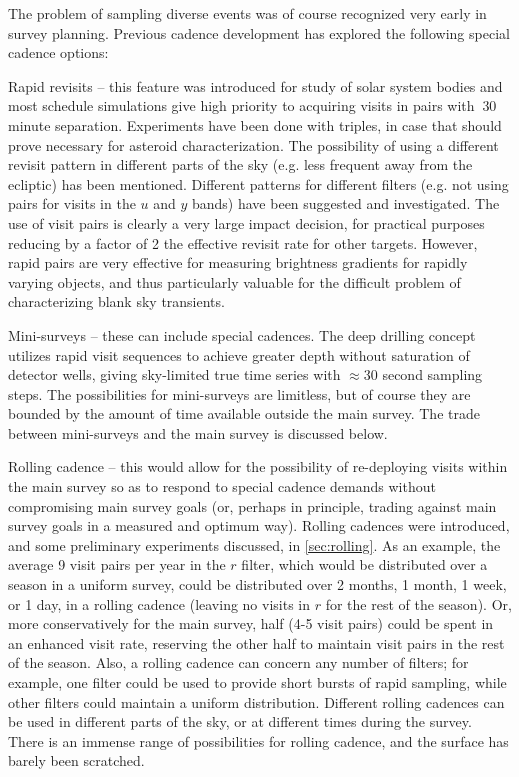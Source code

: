 The problem of sampling diverse events was of course recognized very
early in survey planning. Previous cadence development has explored the
following special cadence options:

\begin{description}

\item{Rapid revisits} -- this feature was introduced for study of solar
system bodies and most schedule simulations give high priority to
acquiring visits in pairs with $~$30 minute separation.  Experiments
have been done with triples, in case that should prove necessary for
asteroid characterization.  The possibility of using a different revisit
pattern in different parts of the sky (e.g. less frequent away from the
ecliptic) has been mentioned.  Different patterns for different filters
(e.g. not using pairs for visits in the $u$ and $y$ bands) have been
suggested and investigated. The use of visit pairs is clearly a very
large impact decision, for practical purposes reducing by a factor of 2
the effective revisit rate for other targets. However, rapid pairs are
very effective for measuring brightness gradients for rapidly varying
objects, and thus particularly valuable for the difficult problem of
characterizing blank sky transients.

\item{Mini-surveys} --  these can include special cadences. The deep
drilling concept utilizes rapid visit sequences to achieve greater depth
without saturation of detector wells, giving sky-limited true time
series with $\approx$30 second sampling steps.  The possibilities for
mini-surveys are limitless, but of course they are bounded by the amount
of time available outside the main survey. The trade between
mini-surveys and the main survey is discussed below.

\item{Rolling cadence} -- this would allow for the possibility of
re-deploying visits within the main survey so as to respond to special
cadence demands without compromising main survey goals (or, perhaps in
principle, trading against main survey goals in a measured and optimum
way). Rolling cadences were introduced, and some preliminary experiments discussed, in \autoref{sec:rolling}.  As an example, the
average 9 visit pairs per year in the $r$ filter, which would be
distributed over a season in a uniform survey, could be distributed over
2 months, 1 month, 1 week, or 1 day, in a rolling cadence (leaving no
visits in $r$ for the rest of the season).  Or, more conservatively for
the main survey, half (4-5 visit pairs) could be spent in an enhanced
visit rate, reserving the other half to maintain visit pairs in the rest
of the season.  Also, a rolling cadence can concern any number of
filters; for example, one filter could be used to provide short bursts
of rapid sampling, while other filters could maintain a uniform
distribution.  Different rolling cadences can be used in different parts
of the sky, or at different times during the survey.  There is an
immense range of possibilities for rolling cadence, and the surface has
barely been scratched.


\end{description}
